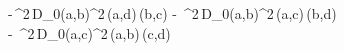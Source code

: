 -\,\lambda^{2}\,D_{0}(a,b)^{2}\,\delta(a,d)\,\delta(b,c) - \,\lambda^{2}\,D_{0}(a,b)^{2}\,\delta(a,c)\,\delta(b,d) \\
\qquad - \,\lambda^{2}\,D_{0}(a,c)^{2}\,\delta(a,b)\,\delta(c,d)
